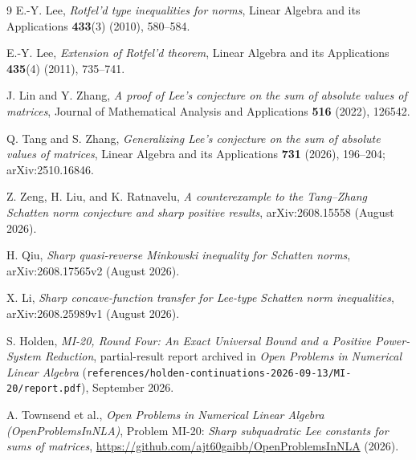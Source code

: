 \documentclass[10pt,letterpaper]{article}
\begin{document}
\begin{thebibliography}{9}
\small
{}
E.-Y. Lee, \emph{Rotfel'd type inequalities for norms}, Linear Algebra and its Applications \textbf{433}(3) (2010), 580--584.

E.-Y. Lee, \emph{Extension of Rotfel'd theorem}, Linear Algebra and its Applications \textbf{435}(4) (2011), 735--741.

J. Lin and Y. Zhang, \emph{A proof of Lee's conjecture on the sum of absolute values of matrices}, Journal of Mathematical Analysis and Applications \textbf{516} (2022), 126542.

Q. Tang and S. Zhang, \emph{Generalizing Lee's conjecture on the sum of absolute values of matrices}, Linear Algebra and its Applications \textbf{731} (2026), 196--204; arXiv:2510.16846.

Z. Zeng, H. Liu, and K. Ratnavelu, \emph{A counterexample to the Tang--Zhang Schatten norm conjecture and sharp positive results}, arXiv:2608.15558 (August 2026).

H. Qiu, \emph{Sharp quasi-reverse Minkowski inequality for Schatten norms}, arXiv:2608.17565v2 (August 2026).

X. Li, \emph{Sharp concave-function transfer for Lee-type Schatten norm inequalities}, arXiv:2608.25989v1 (August 2026).

S. Holden, \emph{MI-20, Round Four: An Exact Universal Bound and a Positive Power-System Reduction}, partial-result report archived in \emph{Open Problems in Numerical Linear Algebra} (\nolinkurl{references/holden-continuations-2026-09-13/MI-20/report.pdf}), September 2026.

A. Townsend et al., \emph{Open Problems in Numerical Linear Algebra (OpenProblemsInNLA)}, Problem MI-20: \emph{Sharp subquadratic Lee constants for sums of matrices}, \url{https://github.com/ajt60gaibb/OpenProblemsInNLA} (2026).
\end{thebibliography}
\end{document}
